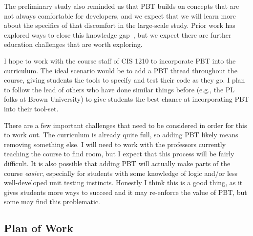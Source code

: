 The preliminary study also reminded us that PBT builds on concepts that are not
always comfortable for developers, and we expect that we will learn more about
the specifics of that discomfort in the large-scale study.  Prior work has
explored ways to close this knowledge
gap~\cite{wrenn2021using,nelson2021automated}, but we expect there are further
education challenges that are worth exploring.

I hope to work with the course staff of CIS 1210 to incorporate PBT into the
curriculum. The ideal scenario would be to add a PBT thread throughout the
course, giving students the tools to specify and test their code as they go.  I
plan to follow the lead of others who have done similar things before (e.g., the
PL folks at Brown University) to give students the best chance at incorporating
PBT into their tool-set.

There are a few important challenges that need to be considered in order for
this to work out.  The curriculum is already quite full, so adding PBT likely
means removing something else. I will need to work with the professors currently
teaching the course to find room, but I expect that this process will be fairly
difficult. It is also possible that adding PBT will actually make parts of the
course {\em easier}, especially for students with some knowledge of logic and/or
less well-developed unit testing instincts. Honestly I think this is a good
thing, as it gives students more ways to succeed and it may re-enforce the value
of PBT, but some may find this problematic.

\subsection{Plan of Work }


